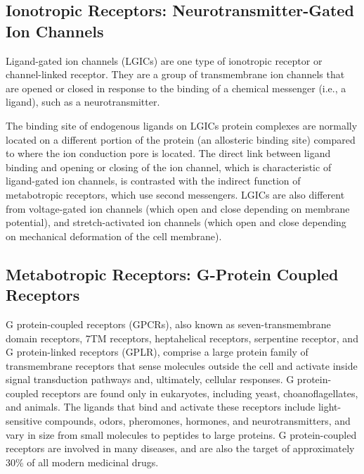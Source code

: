 \hypertarget{ionotropic-receptors-neurotransmitter-gated-ion-channels}{%
\subsection{Ionotropic Receptors: Neurotransmitter-Gated Ion Channels}\label{ionotropic-receptors-neurotransmitter-gated-ion-channels}}

Ligand-gated ion channels (LGICs) are one type of ionotropic receptor or channel-linked receptor. They are a group of transmembrane ion channels that are opened or closed in response to the binding of a chemical messenger (i.e., a ligand), such as a neurotransmitter.

The binding site of endogenous ligands on LGICs protein complexes are normally located on a different portion of the protein (an allosteric binding site) compared to where the ion conduction pore is located. The direct link between ligand binding and opening or closing of the ion channel, which is characteristic of ligand-gated ion channels, is contrasted with the indirect function of metabotropic receptors, which use second messengers. LGICs are also different from voltage-gated ion channels (which open and close depending on membrane potential), and stretch-activated ion channels (which open and close depending on mechanical deformation of the cell membrane).

\hypertarget{metabotropic-receptors-g-protein-coupled-receptors}{%
\subsection{Metabotropic Receptors: G-Protein Coupled Receptors}\label{metabotropic-receptors-g-protein-coupled-receptors}}

G protein-coupled receptors (GPCRs), also known as seven-transmembrane domain receptors, 7TM receptors, heptahelical receptors, serpentine receptor, and G protein-linked receptors (GPLR), comprise a large protein family of transmembrane receptors that sense molecules outside the cell and activate inside signal transduction pathways and, ultimately, cellular responses. G protein-coupled receptors are found only in eukaryotes, including yeast, choanoflagellates, and animals. The ligands that bind and activate these receptors include light-sensitive compounds, odors, pheromones, hormones, and neurotransmitters, and vary in size from small molecules to peptides to large proteins. G protein-coupled receptors are involved in many diseases, and are also the target of approximately 30\% of all modern medicinal drugs.

